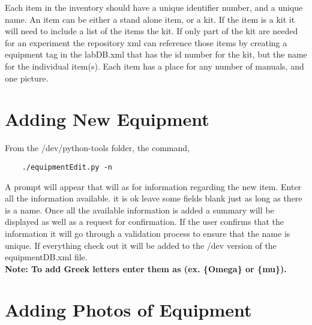 \documentclass[justified]{pjlProcessDocs}
\begin{document}
Each item in the inventory should have a unique identifier number, and a unique name. An item can be either a stand alone item, or a kit. If the item is a kit it will need to include a list of the items the kit. If only part of the kit are needed for an experiment the repository xml can reference those items by creating a equipment tag in the labDB.xml that has the id number for the kit, but the name for the individual item(s). Each item has a place for any number of manuals, and one picture.\\



\section{Adding New Equipment}


From the /dev/python-tools folder, the command,

	\begin{lstlisting}
	./equipmentEdit.py -n       
	\end{lstlisting}

A prompt will appear that will as for information regarding the new item. Enter all the information available. it is ok leave some fields blank just as long as there is a name. Once all the available information is added a summary will be displayed as well as a request for confirmation. If the user confirms that the information it will go through a validation process to ensure that the name is unique. If everything check out it will be added to the /dev version of the equipmentDB.xml file.\\

{\bf Note: To add Greek letters enter them as (ex. \{Omega\} or \{mu\}).}




\section{Adding Photos of Equipment}
\end{document}
